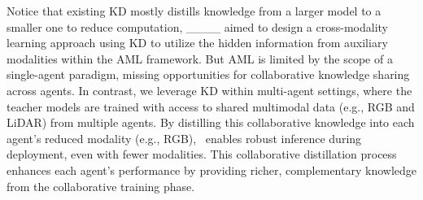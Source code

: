 Notice that existing KD mostly distills knowledge from a larger model to a smaller one to reduce computation, ____ aimed to design a cross-modality learning approach using KD to utilize the hidden information from auxiliary modalities within the AML framework. But AML is limited by the scope of a single-agent paradigm, missing opportunities for collaborative knowledge sharing across agents. In contrast, we leverage KD within multi-agent settings, where the teacher models are trained with access to shared multimodal data (e.g., RGB and LiDAR) from multiple agents. By distilling this collaborative knowledge into each agent’s reduced modality (e.g., RGB), \ours~enables robust inference during deployment, even with fewer modalities. This collaborative distillation process enhances each agent’s performance by providing richer, complementary knowledge from the collaborative training phase.

\vspace{-5pt}